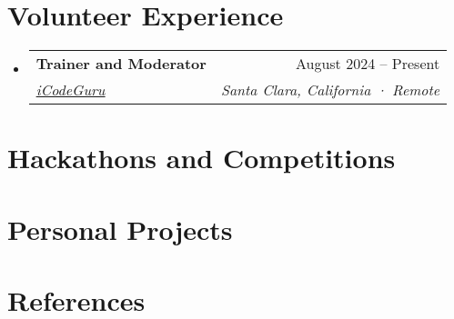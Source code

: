 \documentclass[letterpaper,11pt]{article}
\makeatletter
\newcommand{\resumeSubheading}[4]{
  \vspace{-2pt}\item
    \begin{tabular*}{0.97\textwidth}[t]{l@{\extracolsep{\fill}}r}
      \textbf{#1} & #2 \\
      \textit{\small#3} & \textit{\small #4} \\
    \end{tabular*}\vspace{-7pt}
}
\newcommand{\resumeSubHeadingListStart}{\begin{itemize}[leftmargin=0.15in, label={}]}
\newcommand{\resumeSubHeadingListEnd}{\end{itemize}}
\makeatother
\begin{document}
\section{\textbf{Volunteer Experience}}
\resumeSubHeadingListStart

\resumeSubheading
{Trainer and Moderator}{August 2024 -- Present}
{{\href{https://www.linkedin.com/company/icode-guru/mycompany/}{\underline{iCodeGuru}}}}{Santa Clara, California · Remote}


\resumeSubHeadingListEnd
%



\section{\textbf{Hackathons and Competitions}}
\resumeSubHeadingListStart

%

\resumeSubHeadingListEnd
%

\section{\textbf{Personal Projects}}
\resumeSubHeadingListStart

%

\resumeSubHeadingListEnd


\section{\textbf{References}}
\resumeSubHeadingListStart

%

\resumeSubHeadingListEnd

%

\end{document}
